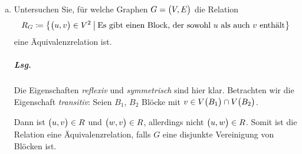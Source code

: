 \documentclass{scrreprt}
\begin{document}
\begin{enumerate}[(a)]

\newpage
\item Untersuchen Sie, für welche Graphen $G = \qty\big(V, E)$ die Relation
  \[
    R_G \coloneqq \qty{
      \qty\big(u, v) \in V^2
      \:\middle|\:
      \text{Es gibt einen Block, der sowohl $u$ als auch $v$ enthält}
    }
  \]
  eine Äquivalenzrelation ist.

  \subparagraph{Lsg.} Die Eigenschaften \emph{reflexiv} und \emph{symmetrisch}
  sind hier klar.
  Betrachten wir die Eigenschaft \emph{transitiv}: Seien $B_1$, $B_2$ Blöcke mit
  $v \in V\qty\big(B_1) \cap V\qty\big(B_2)$.


  Dann ist $\qty\big(u, v) \in R$ und $\qty\big(w, v) \in R$, allerdings nicht
  $\qty\big(u, w) \in R$.
  Somit ist die Relation eine Äquivalenzrelation, falls $G$ eine disjunkte
  Vereinigung von Blöcken ist.
\end{enumerate}
\end{document}
